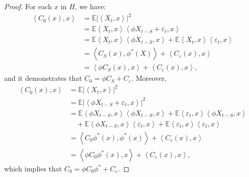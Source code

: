 \documentclass[11pt,a4paper]{article}
\numberwithin{equation}{section}
\newcommand{\E}{\mathbb{E}}
\begin{document}
\begin{proof}
  For each $x$ in $H$, we have:
  \begin{align*}
    \left\langle C_0(x),x\right\rangle
     & = \E\left|\left\langle X_t,x\right\rangle\right|^2 \\
     & = \E\left\langle X_t,x\right\rangle\left\langle \phi X_{t-S}+\varepsilon_t,x\right\rangle \\
     & = \E\left\langle X_t,x\right\rangle\left\langle \phi X_{t-S},x\right\rangle +\E\left\langle X_t,x\right\rangle\left\langle \varepsilon_t,x\right\rangle \\
     & = \left\langle C_S(x),\phi^*(X)\right\rangle+\left\langle C_{\varepsilon}(x),x\right\rangle \\
     & = \left\langle \phi C_S(x),x\right\rangle+\left\langle C_{\varepsilon}(x),x\right\rangle,
  \end{align*}
  and it demonstrates that $C_0=\phi C_S+C_{\varepsilon}$. Moreover,
  \begin{align*}
    \left\langle C_0(x),x\right\rangle
     & = \E\left|\left\langle X_t,x\right\rangle\right|^2 \\
     & = \E\left|\left\langle \phi X_{t-S}+\varepsilon_t,x\right\rangle\right|^2 \\
     & = \E\left\langle \phi X_{t-S},x\right\rangle\left\langle \phi X_{t-S},x\right\rangle
       + \E\left\langle \varepsilon_t,x\right\rangle\left\langle \phi X_{t-S},x\right\rangle \\
     & \quad
       + \E\left\langle \phi X_{t-S},x\right\rangle\left\langle\varepsilon_t,x\right\rangle
       + \E\left\langle\varepsilon_t,x\right\rangle\left\langle\varepsilon_t,x\right\rangle \\
     & = \left\langle C_0\phi^*(x),\phi^*(x)\right\rangle+\left\langle C_{\varepsilon}(x),x\right\rangle \\
     & = \left\langle \phi C_0\phi^*(x),x\right\rangle+\left\langle C_{\varepsilon}(x),x\right\rangle,
  \end{align*}
  which implies that $C_0=\phi C_0\phi^*+C_{\varepsilon}.$


\end{proof}
\end{document}
